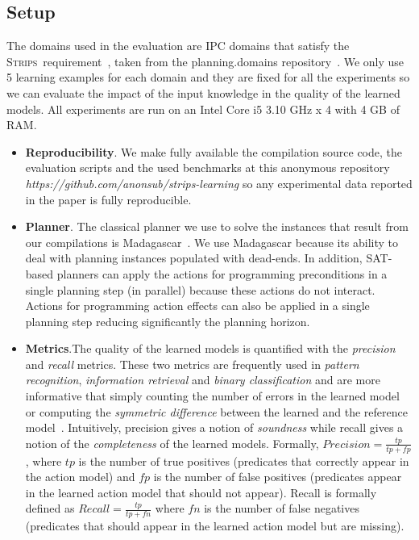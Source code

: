 \documentclass[3p,times]{elsarticle}
\newcommand{\strips}{\textsc{Strips}}     %
\begin{document}
\subsection{Setup}
The domains used in the evaluation are IPC domains that satisfy the \strips\ requirement~\cite{fox2003pddl2}, taken from the {\sc planning.domains} repository~\cite{muise2016planning}. We only use 5 learning examples for each domain and they are fixed for all the experiments so we can evaluate the impact of the input knowledge in the quality of the learned models. All experiments are run on an Intel Core i5 3.10 GHz x 4 with 4 GB of RAM.
\begin{itemize}
\item {\bf Reproducibility}. We make fully available the compilation source code, the evaluation scripts and the used benchmarks at this anonymous repository {\em https://github.com/anonsub/strips-learning} so any experimental data reported in the paper is fully reproducible. 
\item {\bf Planner}. The classical planner we use to solve the instances that result from our compilations is {\sc Madagascar}~\cite{rintanen2014madagascar}. We use {\sc Madagascar} because its ability to deal with planning instances populated with dead-ends. In addition, SAT-based planners can apply the actions for programming preconditions in a single planning step (in parallel) because these actions do not interact. Actions for programming action effects can also be applied in a single planning step reducing significantly the planning horizon.
\item {\bf Metrics}.The quality of the learned models is quantified with the {\em precision} and {\em recall} metrics. These two metrics are frequently used in {\em pattern recognition}, {\em information retrieval} and {\em binary classification} and are more informative that simply counting the number of errors in the learned model or computing the {\em symmetric difference} between the learned and the reference model~\cite{davis2006relationship}. Intuitively, precision gives a notion of {\em soundness} while recall gives a notion of the {\em completeness} of the learned models. Formally, $Precision=\frac{tp}{tp+fp}$, where $tp$ is the number of true positives (predicates that correctly appear in the action model) and $fp$ is the number of false positives (predicates appear in the learned action model that should not appear). Recall is formally defined as $Recall=\frac{tp}{tp+fn}$ where $fn$ is the number of false negatives (predicates that should appear in the learned action model but are missing).
\end{itemize}
  
\end{document}
